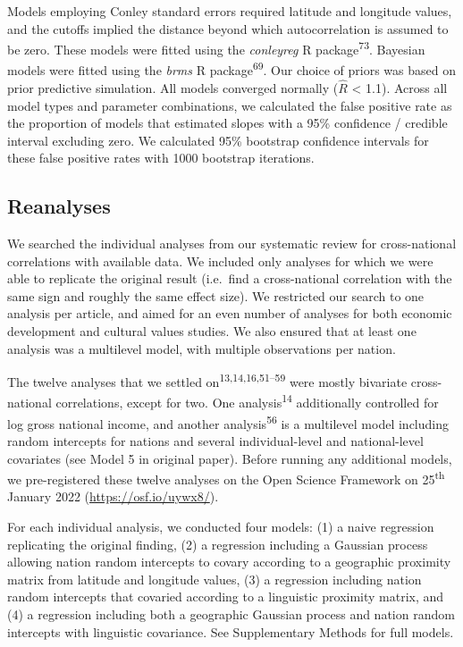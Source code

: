 \documentclass[english,man,floatsintext]{apa6}
\begin{document}
Models employing Conley standard errors required latitude and longitude values, and the cutoffs implied the distance beyond which autocorrelation is assumed to be zero. These models were fitted using the \emph{conleyreg} R package\textsuperscript{73}. Bayesian models were fitted using the \emph{brms} R package\textsuperscript{69}. Our choice of priors was based on prior predictive simulation. All models converged normally (\(\hat{R}\) \textless{} 1.1). Across all model types and parameter combinations, we calculated the false positive rate as the proportion of models that estimated slopes with a 95\% confidence / credible interval excluding zero. We calculated 95\% bootstrap confidence intervals for these false positive rates with 1000 bootstrap iterations.

\hypertarget{reanalyses}{%
\subsection{Reanalyses}\label{reanalyses}}

We searched the individual analyses from our systematic review for cross-national correlations with available data. We included only analyses for which we were able to replicate the original result (i.e.~find a cross-national correlation with the same sign and roughly the same effect size). We restricted our search to one analysis per article, and aimed for an even number of analyses for both economic development and cultural values studies. We also ensured that at least one analysis was a multilevel model, with multiple observations per nation.

The twelve analyses that we settled on\textsuperscript{13,14,16,51--59} were mostly bivariate cross-national correlations, except for two. One analysis\textsuperscript{14} additionally controlled for log gross national income, and another analysis\textsuperscript{56} is a multilevel model including random intercepts for nations and several individual-level and national-level covariates (see Model 5 in original paper). Before running any additional models, we pre-registered these twelve analyses on the Open Science Framework on 25\textsuperscript{th} January 2022 (\url{https://osf.io/uywx8/}).

For each individual analysis, we conducted four models: (1) a naive regression replicating the original finding, (2) a regression including a Gaussian process allowing nation random intercepts to covary according to a geographic proximity matrix from latitude and longitude values, (3) a regression including nation random intercepts that covaried according to a linguistic proximity matrix, and (4) a regression including both a geographic Gaussian process and nation random intercepts with linguistic covariance. See Supplementary Methods for full models.
\end{document}

